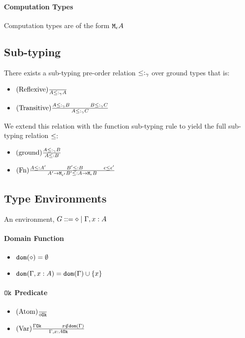 \documentclass{report}
\begin{document}
        \paragraph{Computation Types}
        Computation types are of the form $\texttt{M}_{\epsilon}{A}$

    \subsection{Sub-typing}
        There exists a sub-typing pre-order relation $\leq:_{\gamma}$ over ground types that is:
        \begin{itemize}
            \item $(\text{Reflexive}) \frac{}{A \leq:_{\gamma} A}$
            \item $\treerule{Transitive}{A \subtype_{\ground} B \s \s B \subtype_{\ground} C}{A \subtype_{\ground} C}$
        \end{itemize}

        We extend this relation with the function sub-typing rule to yield the full sub-typing relation $\leq:$

        \begin{itemize}
            \item $(\text{ground}) \frac{A \leq:_{\gamma} B}{A \leq: B}$
            \item $\treerule{Fn}{A \subtype A' \s\s B' \subtype B \s \s \e \subeffect \e'}{\lamtype{A'}{\e'}{B'} \subtype \lamtype{A}{\e}{B}}$
        \end{itemize}
    \subsection{Type Environments}
    An environment, $G ::= \diamond \mid \Gamma, x: A$ 
    \paragraph{Domain Function}
    \begin{itemize}
        \item $\texttt{dom}(\diamond) = \emptyset$
        \item $\texttt{dom}(\Gamma, x: A) =  \texttt{dom}(\Gamma)  \cup \left\{x \right\}$
    \end{itemize}
    \paragraph{$\texttt{Ok}$ Predicate}
    \begin{itemize}
        \item $(\text{Atom}) \frac{}{\diamond \texttt{Ok}}$
        \item $\treerule{Var}{\ok{\G} \s\s x\notin \dom{\G}}{\ok{\gax}}$
    \end{itemize}
\end{document}
